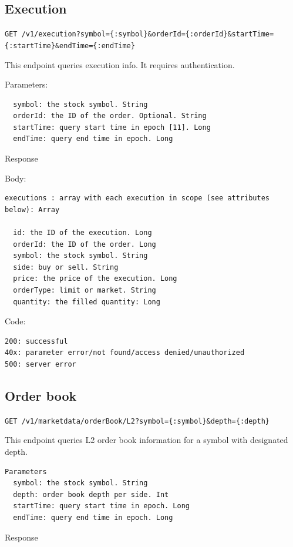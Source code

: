\documentclass{report}
\theoremstyle{definition}
\let\oldsubsection\subsection
\renewcommand{\subsection}{\oldsubsection*}
\begin{document}
\subsection{Execution}

\lstinline|GET /v1/execution?symbol={:symbol}&orderId={:orderId}&startTime={:startTime}&endTime={:endTime}|

This endpoint queries execution info. It requires authentication.

Parameters:

\begin{lstlisting}
  symbol: the stock symbol. String
  orderId: the ID of the order. Optional. String
  startTime: query start time in epoch [11]. Long
  endTime: query end time in epoch. Long
\end{lstlisting}

Response

Body:

\begin{lstlisting}
executions : array with each execution in scope (see attributes below): Array

  id: the ID of the execution. Long
  orderId: the ID of the order. Long
  symbol: the stock symbol. String
  side: buy or sell. String
  price: the price of the execution. Long
  orderType: limit or market. String
  quantity: the filled quantity: Long
\end{lstlisting}

Code:

\begin{lstlisting}
200: successful
40x: parameter error/not found/access denied/unauthorized
500: server error
\end{lstlisting}

\subsection{Order book}

\lstinline|GET /v1/marketdata/orderBook/L2?symbol={:symbol}&depth={:depth}|

This endpoint queries L2 order book information for a symbol with designated depth.

\begin{lstlisting}
Parameters
  symbol: the stock symbol. String
  depth: order book depth per side. Int
  startTime: query start time in epoch. Long
  endTime: query end time in epoch. Long
\end{lstlisting}

Response
\end{document}
